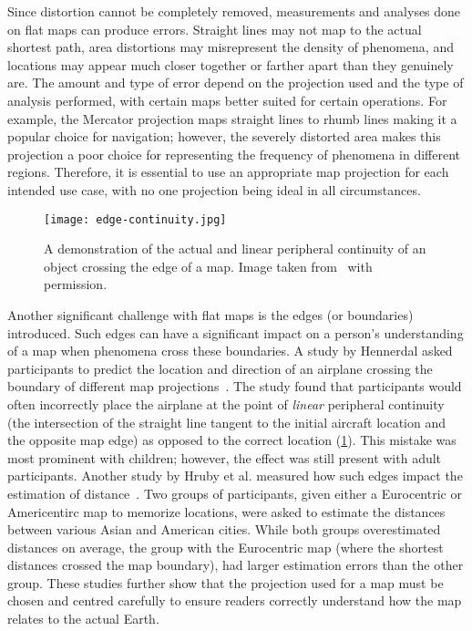 Since distortion cannot be completely removed, measurements and analyses done on flat maps can produce errors.
Straight lines may not map to the actual shortest path, area distortions may misrepresent the density of phenomena, and locations may appear much closer together or farther apart than they genuinely are.
The amount and type of error depend on the projection used and the type of analysis performed, with certain maps better suited for certain operations.
For example, the Mercator projection maps straight lines to rhumb lines making it a popular choice for navigation; however, the severely distorted area makes this projection a poor choice for representing the frequency of phenomena in different regions.
Therefore, it is essential to use an appropriate map projection for each intended use case, with no one projection being ideal in all circumstances.


\begin{figure}[htb!]
	\centering
	\texttt{[image: edge-continuity.jpg]}
	\caption[Actual vs. linear peripheral continuity on a map]{
		A demonstration of the actual and linear peripheral continuity of an object crossing the edge of a map.
		Image taken from~\cite{hennerdal2015beyond} with permission.
	}
	\label{fig:edge-continuity}
\end{figure}


Another significant challenge with flat maps is the edges (or boundaries) introduced.
Such edges can have a significant impact on a person's understanding of a map when phenomena cross these boundaries.
A study by Hennerdal asked participants to predict the location and direction of an airplane crossing the boundary of different map projections~\cite{hennerdal2015beyond}.
The study found that participants would often incorrectly place the airplane at the point of \textit{linear} peripheral continuity (the intersection of the straight line tangent to the initial aircraft location and the opposite map edge) as opposed to the correct location (\cref{fig:edge-continuity}).
This mistake was most prominent with children; however, the effect was still present with adult participants. Another study by Hruby et al. measured how such edges impact the estimation of distance~\cite{hruby2016journey}.
Two groups of participants, given either a Eurocentric or Americentirc map to memorize locations, were asked to estimate the distances between various Asian and American cities.
While both groups overestimated distances on average, the group with the Eurocentric map (where the shortest distances crossed the map boundary), had larger estimation errors than the other group.
These studies further show that the projection used for a map must be chosen and centred carefully to ensure readers correctly understand how the map relates to the actual Earth.


